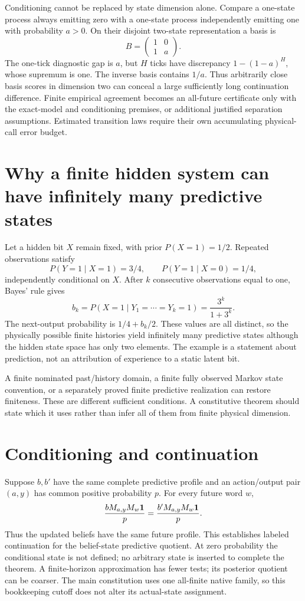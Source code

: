 Conditioning cannot be replaced by state dimension alone. Compare a one-state process always emitting zero with a one-state process independently emitting one with probability $a>0$. On their disjoint two-state representation a basis is
\[
B=\begin{pmatrix}1&0\\1&a\end{pmatrix}.
\]
The one-tick diagnostic gap is $a$, but $H$ ticks have discrepancy $1-(1-a)^H$, whose supremum is one. The inverse basis contains $1/a$. Thus arbitrarily close basis scores in dimension two can conceal a large sufficiently long continuation difference. Finite empirical agreement becomes an all-future certificate only with the exact-model and conditioning premises, or additional justified separation assumptions. Estimated transition laws require their own accumulating physical-call error budget.

\section{Why a finite hidden system can have infinitely many predictive states}\label{section:predictive:why-a-finite-hidden-system-can-have-infinitely-many-predictive-states}
Let a hidden bit $X$ remain fixed, with prior $P(X=1)=1/2$. Repeated observations satisfy
\[
P(Y=1\mid X=1)=3/4,\qquad P(Y=1\mid X=0)=1/4,
\]
independently conditional on $X$. After $k$ consecutive observations equal to one, Bayes' rule gives
\[
b_k=P(X=1\mid Y_1=\cdots=Y_k=1)=\frac{3^k}{1+3^k}.
\]
The next-output probability is $1/4+b_k/2$. These values are all distinct, so the physically possible finite histories yield infinitely many predictive states although the hidden state space has only two elements. The example is a statement about prediction, not an attribution of experience to a static latent bit.

A finite nominated past/history domain, a finite fully observed Markov state convention, or a separately proved finite predictive realization can restore finiteness. These are different sufficient conditions. A constitutive theorem should state which it uses rather than infer all of them from finite physical dimension.

\section{Conditioning and continuation}\label{section:predictive:conditioning-and-continuation}
Suppose $b,b'$ have the same complete predictive profile and an action/output pair $(a,y)$ has common positive probability $p$. For every future word $w$,
\[
\frac{bM_{a,y}M_w\mathbf 1}{p}
=\frac{b'M_{a,y}M_w\mathbf 1}{p}.
\]
Thus the updated beliefs have the same future profile. This establishes labeled continuation for the belief-state predictive quotient. At zero probability the conditional state is not defined; no arbitrary state is inserted to complete the theorem. A finite-horizon approximation has fewer tests; its posterior quotient can be coarser. The main constitution uses one all-finite native family, so this bookkeeping cutoff does not alter its actual-state assignment.

